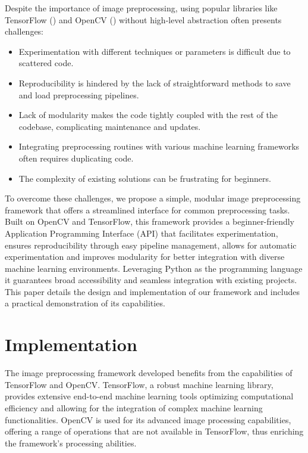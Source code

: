 \documentclass[journal]{new-aiaa}
\begin{document}
Despite the importance of image preprocessing, using popular libraries like TensorFlow (\cite{tensorflow2015}) and OpenCV (\cite{opencv2000}) without high-level abstraction often presents challenges:
\begin{itemize}
	\item Experimentation with different techniques or parameters is difficult due to scattered code.
	\item Reproducibility is hindered by the lack of straightforward methods to save and load preprocessing pipelines.
	\item Lack of modularity makes the code tightly coupled with the rest of the codebase, complicating maintenance and updates.
	\item Integrating preprocessing routines with various machine learning frameworks often requires duplicating code.
	\item The complexity of existing solutions can be frustrating for beginners.
\end{itemize}

To overcome these challenges, we propose a simple, modular image preprocessing framework that offers a streamlined interface for common preprocessing tasks.  Built on OpenCV and TensorFlow, this framework provides a beginner-friendly Application Programming Interface (API) that facilitates experimentation, ensures reproducibility through easy pipeline management, allows for automatic experimentation and improves modularity for better integration with diverse machine learning environments. Leveraging Python as the programming language it guarantees broad accessibility and seamless integration with existing projects.\cite{python}\cite{pythonCV} This paper details the design and implementation of our framework and includes a practical demonstration of its capabilities.


\section{Implementation}
The image preprocessing framework developed benefits from the capabilities of TensorFlow and OpenCV. TensorFlow, a robust machine learning library, provides extensive end-to-end machine learning tools optimizing computational efficiency and allowing for the integration of complex machine learning functionalities.\cite{tensorflowLearn} OpenCV is used for its advanced image processing capabilities, offering a range of operations that are not available in TensorFlow, thus enriching the framework's processing abilities.\cite{opencvTutorial}
\end{document}
